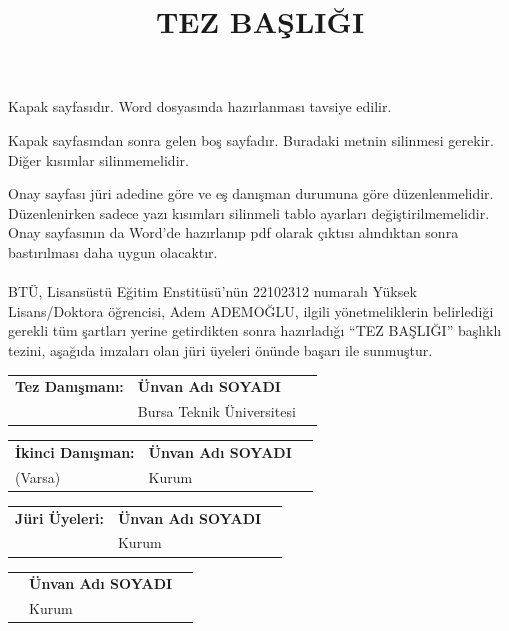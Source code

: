 \documentclass[a4paper,oneside,12pt]{report}
\title{TEZ BAŞLIĞI}
\begin{document}
\newpage
\thispagestyle{empty}
\singlespacing
\vspace*{3cm}
Kapak sayfasıdır. Word dosyasında hazırlanması tavsiye edilir.

\newpage
\thispagestyle{empty}
\singlespacing
\vspace*{3cm}
Kapak sayfasından sonra gelen boş sayfadır. Buradaki metnin silinmesi gerekir. Diğer kısımlar silinmemelidir. 

Onay sayfası jüri adedine göre ve eş danışman durumuna göre düzenlenmelidir. Düzenlenirken sadece yazı kısımları silinmeli tablo ayarları değiştirilmemelidir. Onay sayfasının da Word'de hazırlanıp pdf olarak çıktısı alındıktan sonra bastırılması daha uygun olacaktır.

\newpage
\paragraph{}
\singlespacing
\vspace*{2cm}
\noindent
BTÜ, Lisansüstü Eğitim Enstitüsü’nün 22102312 numaralı Yüksek Lisans/Doktora öğrencisi, Adem ADEMOĞLU, ilgili yönetmeliklerin belirlediği gerekli tüm şartları yerine getirdikten sonra hazırladığı “TEZ BAŞLIĞI” başlıklı tezini, aşağıda imzaları olan jüri üyeleri önünde başarı ile sunmuştur.

\vspace{2cm}
\begin{tabular}{p{4cm} p{6cm} p{3.5cm}}  
\textbf{Tez Danışmanı:} & \textbf{Ünvan Adı SOYADI} & \dotfill \\  
& Bursa Teknik Üniversitesi  & \\
\end{tabular}

\vspace{0.6cm}
\begin{tabular}{p{4cm} p{6cm} p{3.5cm}}  
	\textbf{İkinci Danışman:} & \textbf{Ünvan Adı SOYADI} & \dotfill \\  
	(Varsa) & Kurum   & \\
\end{tabular}

\vspace{0.6cm}
\begin{tabular}{p{4cm} p{6cm} p{3.5cm}}  
	\textbf{Jüri Üyeleri:} & \textbf{Ünvan Adı SOYADI} & \dotfill \\
	& Kurum   & \\
\end{tabular}

\vspace{0.6cm}
\begin{tabular}{p{4cm} p{6cm} p{3.5cm}}  
	 & \textbf{Ünvan Adı SOYADI} & \dotfill \\
	 & Kurum   & \\
\end{tabular}
\end{document}
